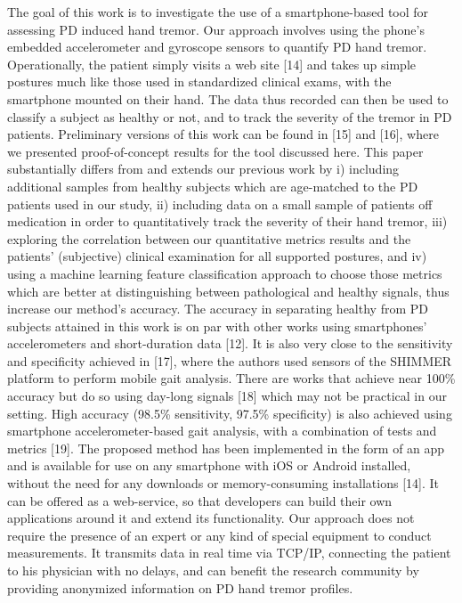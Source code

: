 The goal of this work is to investigate the use of a smartphone-based tool for assessing PD induced hand tremor. Our approach involves using the phone’s embedded accelerometer and gyroscope sensors to quantify PD hand tremor. Operationally, the patient simply visits a web site [14] and takes up simple postures much like those used in standardized clinical exams, with the smartphone mounted on their hand. The data thus recorded can then be used to classify a subject as healthy or not, and to track the severity of the tremor in PD patients. 
Preliminary versions of this work can be found in [15] and [16], where we presented proof-of-concept results for the tool discussed here. This paper substantially differs from and extends our previous work by i) including additional samples from healthy subjects which are age-matched to the PD patients used in our study, ii) including data on a small sample of patients off medication in order to quantitatively track the severity of their hand tremor, iii) exploring the correlation between our quantitative metrics results and the patients’ (subjective) clinical examination for all supported postures, and iv) using a machine learning feature classification approach to choose those metrics which are better at distinguishing between pathological and healthy signals, thus  increase our method’s accuracy. The accuracy in separating healthy from PD subjects attained in this work is on par with other works using smartphones’ accelerometers and short-duration data [12]. It is also very close to the sensitivity and specificity achieved in [17], where the authors used sensors of the SHIMMER platform to perform mobile gait analysis. There are works that achieve near 100\% accuracy but do so using day-long signals [18] which may not be practical in our setting. High accuracy (98.5\% sensitivity, 97.5\% specificity) is also achieved using smartphone accelerometer-based gait analysis, with a combination of tests and metrics [19]. 
The proposed method has been implemented in the form of an app and is available for use on any smartphone with iOS or Android installed, without the need for any downloads or memory-consuming installations [14]. It can be offered as a web-service, so that developers can build their own applications around it and extend its functionality. Our approach does not require the presence of an expert or any kind of special equipment to conduct measurements. It transmits data in real time via TCP/IP, connecting the patient to his physician with no delays, and can benefit the research community by providing anonymized information on PD hand tremor profiles. 

